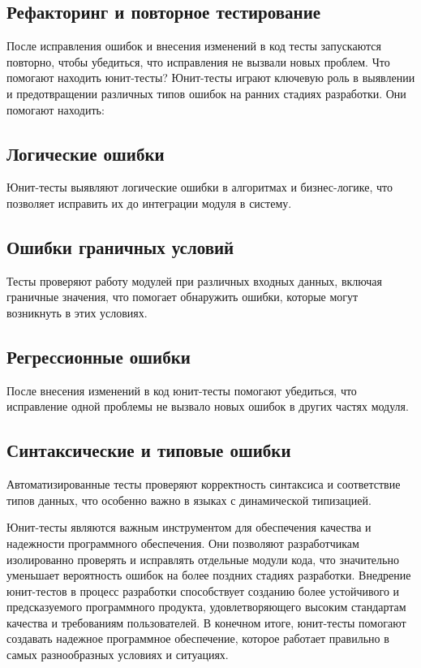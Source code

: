     \subsection*{Рефакторинг и повторное тестирование}
    После исправления ошибок и внесения изменений в код тесты запускаются повторно, чтобы убедиться, что исправления не вызвали новых проблем. Что помогают находить юнит-тесты? Юнит-тесты играют ключевую роль в выявлении и предотвращении различных типов ошибок на ранних стадиях разработки. Они помогают находить: 

    \subsection*{Логические ошибки}
    Юнит-тесты выявляют логические ошибки в алгоритмах и бизнес-логике, что позволяет исправить их до интеграции модуля в систему. 

    \subsection*{Ошибки граничных условий}
    Тесты проверяют работу модулей при различных входных данных, включая граничные значения, что помогает обнаружить ошибки, которые могут возникнуть в этих условиях.
    
    \subsection*{Регрессионные ошибки}
    После внесения изменений в код юнит-тесты помогают убедиться, что исправление одной проблемы не вызвало новых ошибок в других частях модуля. 
    
    \subsection*{Синтаксические и типовые ошибки}
    Автоматизированные тесты проверяют корректность синтаксиса и соответствие типов данных, что особенно важно в языках с динамической типизацией. 

    Юнит-тесты являются важным инструментом для обеспечения качества и надежности программного обеспечения. Они позволяют разработчикам изолированно проверять и исправлять отдельные модули кода, что значительно уменьшает вероятность ошибок на более поздних стадиях разработки. Внедрение юнит-тестов в процесс разработки способствует созданию более устойчивого и предсказуемого программного продукта, удовлетворяющего высоким стандартам качества и требованиям пользователей. В конечном итоге, юнит-тесты помогают создавать надежное программное обеспечение, которое работает правильно в самых разнообразных условиях и ситуациях.

